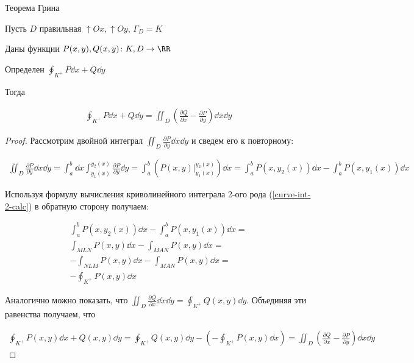 
\begin{twocolumns}
  \begin{theorem}\label{Green}
    Теорема Грина

    Пусть \(D\) правильная \(\uparrow Ox, \uparrow Oy\), \(\Gamma_{D} = K\)
    
    Даны функции \(P(x, y), Q(x, y) \colon K, D \to \RR\)

    Определен \(\displaystyle \oint_{K^{+}} P \dd x + Q \dd y\)
    
    Тогда

    \begin{align*}
      \boxed{
        \oint_{K^{+}} P \dd x + Q \dd y
        = \iint_{D}^{} \left(
          \frac{\partial Q}{\partial x} -
          \frac{\partial P}{\partial y}
        \right) \dd x \dd y
      }
    \end{align*}
  \end{theorem}
  \vfill\null
  \columnbreak

  
\end{twocolumns}

\begin{proof}
  Рассмотрим двойной интеграл
  \(\displaystyle \iint_{D} \frac{\partial P}{\partial y} \dd x \dd y\)
  и сведем его к повторному:

  \begin{align*}
    \iint_{D} \frac{\partial P}{\partial y} \dd x \dd y
    = \int_{a}^{b} \dd x \int_{y_{1}(x)}^{y_{2}(x)}
      \frac{\partial P}{\partial y} \dd y
    = \int_{a}^{b} \left(
      P(x, y) \bigg\vert_{y_{1}(x)}^{y_{2}(x)}
    \right) \dd x
    = \int_{a}^{b} P(x, y_{2}(x)) \dd x
      - \int_{a}^{b} P(x, y_{1}(x)) \dd x 
  \end{align*}

  Используя формулу вычисления криволинейного интеграла 2-ого рода
  (\ref{curve-int-2-calc}) в обратную сторону получаем:

  \begin{align*}
    \int_{a}^{b} P(x, y_{2}(x)) \dd x - \int_{a}^{b} P(x, y_{1}(x)) \dd x = \\
    \int_{MLN} P(x, y) \dd x - \int_{MAN} P(x, y) \dd x = \\
    -\int_{NLM} P(x, y) \dd x - \int_{MAN} P(x, y) \dd x = \\
    -\oint_{K^{+}} P(x, y) \dd x 
  \end{align*}

  Аналогично можно показать, что \(\displaystyle
    \iint_{D} \frac{\partial Q}{\partial x} \dd x \dd y
    = \oint_{K^{+}} Q(x, y) \dd y 
  \). Объединяя эти равенства получаем, что

  \begin{align*}
    \oint_{K^{+}} P(x, y) \dd x + Q(x, y) \dd y
    = \oint_{K^{+}} Q (x, y) \dd y - \left(-\oint_{K^{+}} P(x, y) \dd x \right)
    = \iint_{D} \left(
      \frac{\partial Q}{\partial x}
      - \frac{\partial P}{\partial y}
    \right) \dd x \dd y
  \end{align*}
\end{proof}

